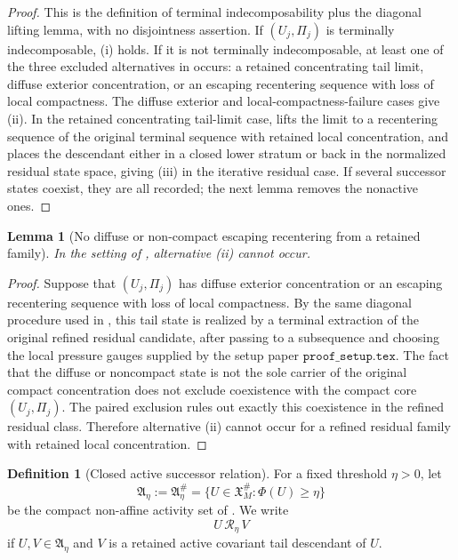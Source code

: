 \documentclass[11pt]{amsart}
\numberwithin{equation}{section}
\theoremstyle{plain}
\newtheorem{lemma}[theorem]{Lemma}
\theoremstyle{definition}
\newtheorem{definition}[theorem]{Definition}
\theoremstyle{remark}
\begin{document}
\begin{proof}
This is the definition of terminal indecomposability plus the diagonal lifting
lemma, with no disjointness assertion.  If \((U_j,\Pi_j)\) is terminally
indecomposable, (i) holds.  If it is not terminally indecomposable, at least one
of the three excluded alternatives in  occurs:
a retained concentrating tail limit, diffuse exterior concentration, or an
escaping recentering sequence with loss of local compactness.  The diffuse
exterior and local-compactness-failure cases give (ii).  In the retained
concentrating tail-limit case,  lifts the
limit to a recentering sequence of the original terminal sequence with retained
local concentration, and  places the descendant
either in a closed lower stratum or back in the normalized residual state space,
giving (iii) in the iterative residual case.  If several successor states
coexist, they are all recorded; the next lemma removes the nonactive ones.
\end{proof}

\begin{lemma}[No diffuse or non-compact escaping recentering from a retained family]
\label{lem:no-nonactive-successor}
In the setting of , alternative
\emph{(ii)} cannot occur.
\end{lemma}

\begin{proof}
Suppose that \((U_j,\Pi_j)\) has diffuse exterior concentration or an escaping
recentering sequence with loss of local compactness.  By the same diagonal
procedure used in , this tail state is
realized by a terminal extraction of the original refined residual candidate,
after passing to a subsequence and choosing the local pressure gauges supplied
by the setup paper \(\texttt{proof\_setup.tex}\).  The fact that the diffuse or
noncompact state is not the sole carrier of the original compact concentration
does not exclude coexistence with the compact core \((U_j,\Pi_j)\).  The paired exclusion
 rules out exactly this coexistence in the
refined residual class.  Therefore alternative (ii) cannot occur for a refined
residual family with retained local concentration.
\end{proof}

\begin{definition}[Closed active successor relation]
\label{def:closed-active-successor-relation}
For a fixed threshold \(\eta>0\), let
\[
   \mathfrak A_\eta:=\mathfrak A_\eta^\#
   =
   \{U\in\mathfrak X_M^\#:\Phi(U)\ge\eta\}
\]
be the compact non-affine activity set of
.  We write
\[
   U\,\mathcal R_\eta\,V
\]
if \(U,V\in\mathfrak A_\eta\) and \(V\) is a retained active covariant tail
descendant of \(U\).
\end{definition}
\end{document}
